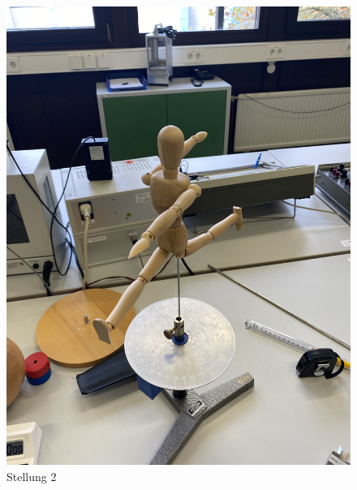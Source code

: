 \begin{figure}
  \centering
  \includegraphics[width=\textwidth, angle=270]{Bilder/Stellung2.jpg}
  \caption{Stellung 2}
  \label{fig:Stellung2}
\end{figure}
